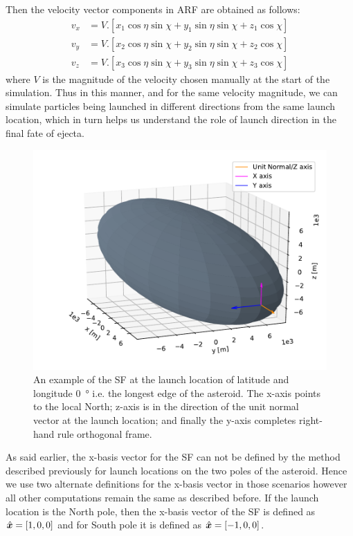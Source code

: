 Then the velocity vector components in \gls{ARF} are obtained as follows:
\begin{align}
    v_x &= V . \left[ x_1 \cos\eta \sin\chi + y_1 \sin\eta \sin\chi + z_1 \cos\chi \right]
    \label{eqn:xVelocity} \\
    v_y &= V . \left[ x_2 \cos\eta \sin\chi + y_2 \sin\eta \sin\chi + z_2 \cos\chi \right]
    \label{eqn:yVelocity} \\
    v_z &= V . \left[ x_3 \cos\eta \sin\chi + y_3 \sin\eta \sin\chi + z_3 \cos\chi \right]
    \label{eqn:zVelocity}
\end{align}
where $V$ is the magnitude of the velocity chosen manually at the start of the simulation. Thus in this manner, and for the same velocity magnitude, we can simulate particles being launched in different directions from the same launch location, which in turn helps us understand the role of launch direction in the final fate of ejecta.
\begin{figure}[htb]
\centering
\captionsetup{justification=centering}
\includegraphics[width=\textwidth, height=0.4\textheight, keepaspectratio=true]{surfaceFrame_longestEdge.pdf}
\caption{An example of the \gls{SF} at the launch location of latitude and longitude \SI{0}{\degree} i.e. the longest edge of the asteroid. The x-axis points to the local North; z-axis is in the direction of the unit normal vector at the launch location; and finally the y-axis completes right-hand rule orthogonal frame.}
\label{fig:surface_frame}
\end{figure}
\FloatBarrier
As said earlier, the x-basis vector for the \gls{SF} can not be defined by the method described previously for launch locations on the two poles of the asteroid. Hence we use two alternate definitions for the x-basis vector in those scenarios however all other computations remain the same as described before. If the launch location is the North pole, then the x-basis vector of the \gls{SF} is defined as $\hat{\bm{x}}=[1, 0, 0]$ and for South pole it is defined as $\hat{\bm{x}}=[-1, 0, 0]$.

